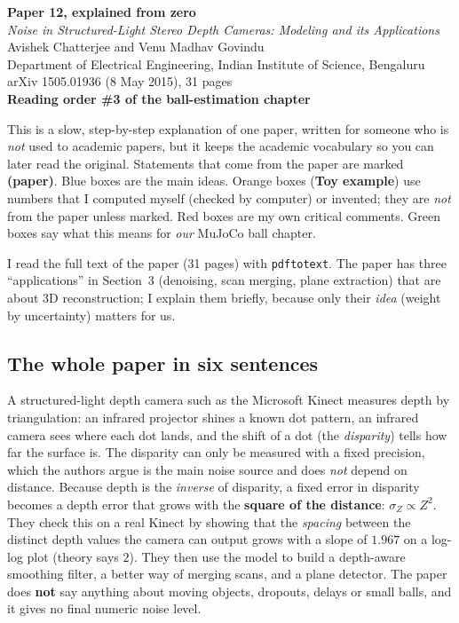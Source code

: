 \documentclass[11pt,a4paper]{article}
\begin{document}
\setcounter{tocdepth}{1}

\begin{center}
{\LARGE\bfseries\color{cblue} Paper 12, explained from zero}\\[0.6em]
{\large \textit{Noise in Structured-Light Stereo Depth Cameras: Modeling and its Applications}}\\[0.5em]
Avishek Chatterjee and Venu Madhav Govindu\\
Department of Electrical Engineering, Indian Institute of Science, Bengaluru\\
arXiv 1505.01936 (8 May 2015), 31 pages\\[0.4em]
\textbf{Reading order \#3 of the ball-estimation chapter}
\end{center}

\begin{idea}
This is a slow, step-by-step explanation of one paper, written for someone who is \emph{not}
used to academic papers, but it keeps the academic vocabulary so you can later read the
original. Statements that come from the paper are marked \textbf{(paper)}. Blue boxes are the
main ideas. Orange boxes (\textbf{Toy example}) use numbers that I computed myself (checked by
computer) or invented; they are \emph{not} from the paper unless marked. Red boxes are my own
critical comments. Green boxes say what this means for \emph{our} MuJoCo ball chapter.

I read the full text of the paper (31 pages) with \texttt{pdftotext}. The paper has three
``applications'' in Section~3 (denoising, scan merging, plane extraction) that are about 3D
reconstruction; I explain them briefly, because only their \emph{idea} (weight by uncertainty)
matters for us.
\end{idea}

\subsection*{The whole paper in six sentences}
A structured-light depth camera such as the Microsoft Kinect measures depth by triangulation: an
infrared projector shines a known dot pattern, an infrared camera sees where each dot lands, and
the shift of a dot (the \emph{disparity}) tells how far the surface is. The disparity can only be
measured with a fixed precision, which the authors argue is the main noise source and does
\emph{not} depend on distance. Because depth is the \emph{inverse} of disparity, a fixed error in
disparity becomes a depth error that grows with the \textbf{square of the distance}:
$\sigma_Z\propto Z^2$. They check this on a real Kinect by showing that the \emph{spacing} between
the distinct depth values the camera can output grows with a slope of $1.967$ on a log-log plot
(theory says $2$). They then use the model to build a depth-aware smoothing filter, a better way
of merging scans, and a plane detector. The paper does \textbf{not} say anything about moving
objects, dropouts, delays or small balls, and it gives no final numeric noise level.
\end{document}
